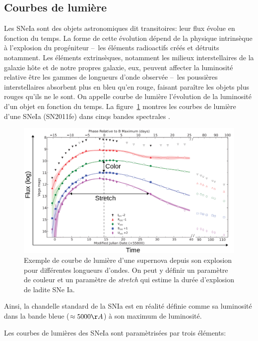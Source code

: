 \documentclass[a4paper, 12pt, svgnames]{article}
\newcommand{\mr}[1]{{\textcolor[rgb]{0.80,0.10,0.1}{#1}}}
\begin{document}

\subsection{Courbes de lumière}\label{ssec:lc}

\mr{Les SNeIa sont des objets astronomiques dit transitoires: leur flux évolue
en fonction du temps. La forme de cette évolution dépend de la physique
intrinsèque à l'explosion du progéniteur --~les éléments radioactifs créés et
détruits notamment. Les éléments extrinsèques, notamment les milieux
interstellaires de la galaxie hôte et de notre propres galaxie, eux, peuvent
affecter la luminosité relative être les gammes de longueurs d'onde observée
--~les poussières interstellaires absorbent plus en bleu qu'en rouge, faisant
paraître les objets plus rouges qu'ils ne le sont. On appelle courbe de lumière
l'évolution de la luminosité d'un objet en fonction du temps. La
figure~\ref{fig:lightcurves} montres les courbes de lumière d'une SNeIa
(SN2011fe) dans cinqs bandes spectrales \cite{pereira2013}.}

\begin{figure}[htbp!]
    \centering
    \includegraphics[width=.5\linewidth]{Rapport_figures/lightcurve.png}
    \captionsetup{justification=centering}
    \caption{Exemple de courbe de lumière d'une supernova depuis son explosion
    pour différentes longueurs d'ondes. On peut y définir un paramètre de
couleur et un paramètre de \textit{stretch} qui estime la durée d'explosion de
ladite SNe Ia.}
    \label{fig:lightcurves}
\end{figure}

\mr{Ainsi, la chandelle standard de la SNIa est en réalité définie comme sa
luminosité dans la bande bleue ($\approx5000\AA$) à son maximum de luminosité}.

\mr{Les courbes de lumières des SNeIa sont paramètrisées par trois éléments:}
\end{document}
